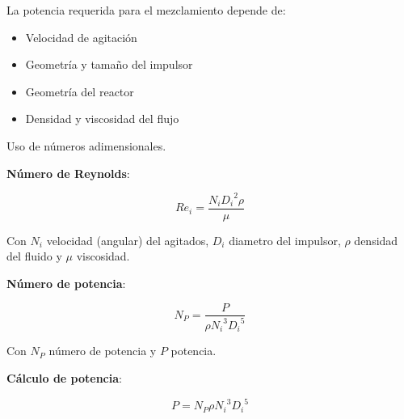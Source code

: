             
            La potencia requerida para el mezclamiento depende de:
            
            \begin{multicols}{2}
                \begin{itemize}
                    \item Velocidad de agitación
                    \item Geometría y tamaño del impulsor
                    \item Geometría del reactor
                    \item Densidad y viscosidad del flujo
                \end{itemize}
            \end{multicols}
            
            Uso de números adimensionales.
            
            \begin{multicols}{2}
                \textbf{Número de Reynolds}:
                
                \begin{equation}
                \label{eq:numero_reynolds}
                    {Re}_{i} = \frac{N_{i}{D_{i}}^{2}\rho}{\mu}
                \end{equation}
                
                Con \(N_{i}\) velocidad (angular) del agitados, \(D_{i}\) diametro del impulsor, \(\rho\) densidad del fluido y \(\mu\) viscosidad.
                
                \textbf{Número de potencia}:
                
                \begin{equation}
                \label{eq:numero_potencia}
                    {N}_{P} = \frac{P}{\rho {N_{i}}^{3}{D_{i}}^{5}}
                \end{equation}
                
                Con \(N_{P}\) número de potencia y \(P\) potencia.
                \newline
                \newline
            \end{multicols}    
                
            \textbf{Cálculo de potencia}:
            
            \begin{equation}
            \label{eq:calculo_potencia}
                P = {N}_{P}\rho {N_{i}}^{3}{D_{i}}^{5}
            \end{equation}
            
